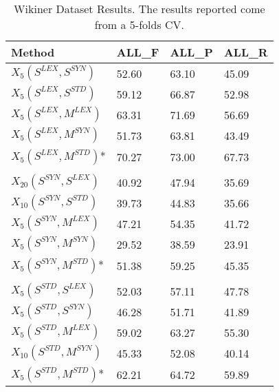 \begin{table*}[]
\centering
\begin{tabular}{@{}llll@{}}
\toprule
\textbf{Method} & \textbf{ALL\_F} & \textbf{ALL\_P} & \textbf{ALL\_R} \\ \midrule
$X_5(S^{LEX}, S^{SYN})$      & 52.60           & 63.10           & 45.09           \\
$X_5(S^{LEX}, S^{STD})$  & 59.12           & 66.87            & 52.98     \\ 
$X_5(S^{LEX}, M^{LEX})$  & 63.31           & 71.69            & 56.69           \\ 
$X_5(S^{LEX}, M^{SYN})$  & 51.73           & 63.81            & 43.49           \\ 
$X_5(S^{LEX}, M^{STD})$* & 70.27           & 73.00            & 67.73           \\  
%
                             &       &       &       \\
$X_{20}(S^{SYN}, S^{LEX})$     & 40.92          & 47.94           & 35.69           \\
$X_{10}(S^{SYN}, S^{STD})$  & 39.73           & 44.83            & 35.66     \\ 
$X_5(S^{SYN}, M^{LEX})$ &  47.21          & 54.35            & 41.72          \\ 
$X_5(S^{SYN}, M^{SYN})$  & 29.52           & 38.59            & 23.91           \\ 
$X_5(S^{SYN}, M^{STD})$*  & 51.38           & 59.25            & 45.35           \\  
%
                             &       &       &       \\
$X_5(S^{STD}, S^{LEX})$      & 52.03           & 57.11           & 47.78           \\
$X_5(S^{STD}, S^{SYN})$  &46.28				&51.71						&41.89   \\ 
$X_5(S^{STD}, M^{LEX})$  & 59.02           & 63.27            & 55.30           \\ 
$X_{10}(S^{STD}, M^{SYN})$  & 45.33           & 52.08            & 40.14           \\ 
$X_5(S^{STD}, M^{STD})$*  &62.21	&64.72	&59.89            \\ \bottomrule 
%
%

\end{tabular}
\caption{Wikiner Dataset Results. The results reported come from a 5-folds CV.}
\label{tab:wikigold}
\end{table*}
